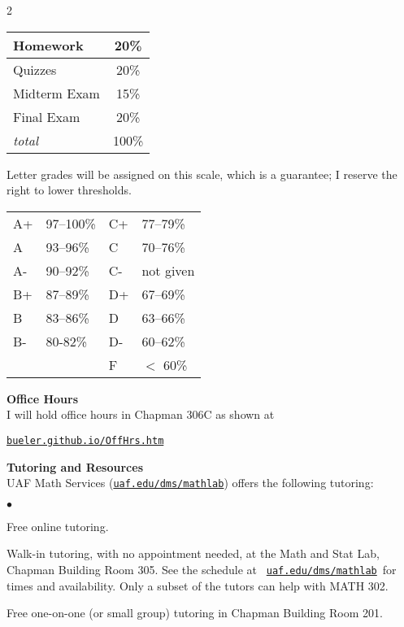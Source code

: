 \documentclass[12pt]{article}
\renewcommand{\emph}[1]{\textsf{\textbf{#1}}}
\newcommand{\localhead}[1]{\par\smallskip\textbf{#1}\nobreak\\}%
\def\heading#1{\localhead{\large\emph{#1}}}
\newenvironment{clist}%
{\bgroup\parskip 0pt\begin{list}{$\bullet$}{\partopsep 4pt\topsep 0pt\itemsep -2pt}}%
{\end{list}\egroup}%
\begin{document}
\begin{multicols}{2}

\begin{tabular}{|l|c|}
\hline
Homework & 20\%\\
\hline
Quizzes& 20\% \\
\hline
Midterm Exam & 15\%  \\
\hline
Final Exam& 20\% \\
\hline
\textsl{total} & 100\%\\
\hline
\end{tabular}

\vskip 25pt

Letter grades will be assigned on this scale, which is a guarantee; I reserve the right to lower thresholds. 

\begin{tabular}{llll}
A+ & 97--100\% \quad\strut & C+ & 77--79\% \\
A & 93--96\% &  C & 70--76\% \\
A- & 90--92\% & C- & not given \\
B+ & 87--89\% & D+ & 67--69\% \\
B &  83--86\% & D & 63--66\% \\
B- & 80-82\% & D- & 60--62\% \\
 & & F  & $<$ 60\%
\end{tabular}
\end{multicols}


\vspace{-0.3in}

\heading{Office Hours}
I will hold office hours in Chapman 306C as shown at

\smallskip
\centerline{\href{http://bueler.github.io/OffHrs.htm}{\tt bueler.github.io/OffHrs.htm}}


\heading{Tutoring and Resources}
UAF Math Services (\href{http://www.uaf.edu/dms/mathlab/}{\texttt{uaf.edu/dms/mathlab}}) offers the following tutoring:
\begin{clist}
	\item Free online tutoring.
	\item Walk-in tutoring, with no appointment needed, at the Math and Stat Lab, Chapman Building Room 305.  See the schedule at \, \href{http://www.uaf.edu/dms/mathlab/}{\texttt{uaf.edu/dms/mathlab}}\, for times and availability.  Only a subset of the tutors can help with MATH 302.
	\item Free one-on-one (or small group) tutoring in Chapman Building Room 201.
\end{clist}
\end{document}
